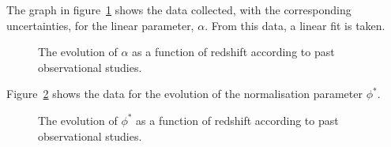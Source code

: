             The graph in figure~\ref{fig:alpha_evolution} shows the data collected, with the corresponding uncertainties, for the linear parameter, $\alpha$. From this data, a linear fit is taken.
            \begin{figure}[!htb]
                \begin{center}
                    \begingroup{}
                    \resizebox{0.7\textwidth}{!}{%
                        
                    }\endgroup
                    \caption{The evolution of $\alpha$ as a function of redshift according to past observational studies.\label{fig:alpha_evolution}}
                \end{center}
            \end{figure}

            Figure~\ref{fig:phi_evolution} shows the data for the evolution of the normalisation parameter $\phi^{*}$.
            \begin{figure}[!htb]
                \begin{center}
                    \begingroup{}
                    \resizebox{0.7\textwidth}{!}{%
                        
                    }\endgroup
                    \caption{The evolution of $\phi^{*}$ as a function of redshift according to past observational studies.\label{fig:phi_evolution}}
                \end{center}
            \end{figure}

